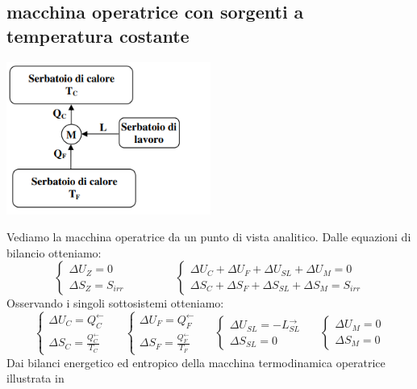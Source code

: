 \subsection{macchina operatrice con sorgenti a temperatura costante}
\begin{center}
    \includegraphics[height=5cm]{../NOTE SUGLI ESERCIZI/img5.PNG}
\end{center}
Vediamo la macchina operatrice da un punto di vista analitico.\newline
Dalle equazioni di bilancio otteniamo:
\[
    \begin{cases}
        \Delta U_Z = 0\\ \Delta S_Z = S_{irr}
    \end{cases} \;\;\;\;\;\;\;\;\;\;\;\;\;\;\; \begin{cases}
        \Delta U_C + \Delta U_F + \Delta U_{SL} + \Delta U_M = 0 \\
        \Delta S_C + \Delta S_F + \Delta S_{SL} + \Delta S_M = S_{irr}
    \end{cases}
\]
Osservando i singoli sottosistemi otteniamo:
\[
    \begin{cases}
        \Delta U_C = Q_C^\leftarrow \\ \Delta S_C = \frac{Q_C^\leftarrow }{T_C}
    \end{cases} \;\;\;\;\; \begin{cases}
        \Delta U_F = Q_F^\leftarrow \\ \Delta S_F = \frac{Q_F^\leftarrow}{T_F}
    \end{cases} \;\;\;\;\; \begin{cases}
        \Delta U_{SL} = - L_{SL}^\rightarrow \\ \Delta S_{SL} = 0
    \end{cases} \;\;\;\;\; \begin{cases}
        \Delta U_M = 0\\ \Delta S_M = 0
    \end{cases}
\]
Dai bilanci energetico ed entropico della macchina termodinamica operatrice illustrata in

